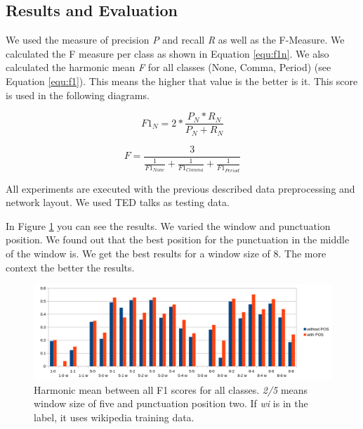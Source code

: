 \subsection{Results and Evaluation}

We used the measure of precision \emph{P} and recall \emph{R} as well as the F-Measure. We calculated the F measure per class as shown in Equation \ref{equ:f1n}.
We also calculated the harmonic mean \emph{F} for all classes (None, Comma, Period) (see Equation \ref{equ:f1}). This means the higher that value is the better is it. This score is used in the following diagrams.

\begin{equation}
\label{equ:f1n}
F1_{N} = 2 * \frac{P_{N}* R_{N}}{P_{N}+R_{N}}
\end{equation}

\begin{equation}
\label{equ:f1}
F = \frac{3}{\frac{1}{F1_{None}} + \frac{1}{F1_{Comma}} + \frac{1}{F1_{Period}}}
\end{equation}

All experiments are executed with the previous described data preprocessing and network layout.
We used TED talks as testing data. 

In Figure \ref{fig:window_eval} you can see the results. 
We varied the window and punctuation position. 
We found out that the best position for the punctuation in the middle of the window is.
We get the best results for a window size of 8. 
The more context the better the results.

\begin{figure}[ht]
    \centering
    \includegraphics[width=\textwidth]{img/window_eval.png}
    \caption{Harmonic mean between all F1 scores for all classes. \emph{2/5} means window size of five and punctuation position two. If \emph{wi} is in the label, it uses wikipedia training data.}
    \label{fig:window_eval}
\end{figure}

